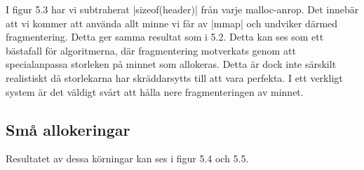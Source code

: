 \documentclass[paper=a4, fontsize=11pt]{scrartcl} %
\numberwithin{equation}{section} %
\numberwithin{figure}{section} %
\numberwithin{table}{section} %
\begin{document}
I figur 5.3 har vi subtraherat |sizeof(header)| från varje malloc-anrop.
Det innebär att vi kommer att använda allt minne vi får av |mmap| och undviker
därmed fragmentering. Detta ger samma resultat som i 5.2.
Detta kan ses som ett bästafall för algoritmerna, där fragmentering motverkats
genom att specialanpassa storleken på minnet som allokeras. Detta är dock inte
särskilt realistiskt då storlekarna har skräddarsytts till att vara perfekta.
I ett verkligt system är det väldigt svårt att hålla nere fragmenteringen
av minnet.


\subsection{Små allokeringar}

Resultatet av dessa körningar kan ses i figur 5.4 och 5.5.
\end{document}
